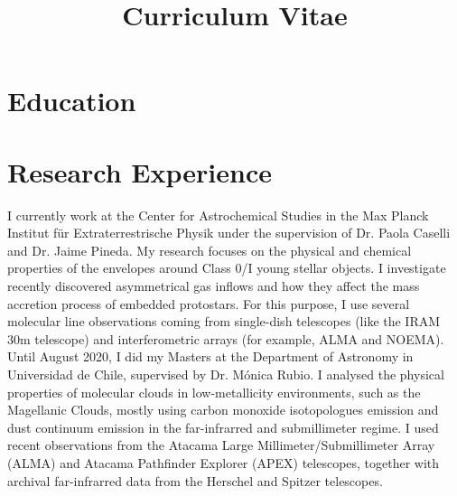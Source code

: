 \documentclass[11pt,a4paper,verdana]{moderncv} %
\title{Curriculum Vitae}
\begin{document}
\makecvtitle %

\section{Education}

\section{Research Experience}

I currently work at the Center for Astrochemical Studies in the Max Planck Institut f\"{u}r Extraterrestrische Physik under the supervision of Dr. Paola Caselli and Dr. Jaime Pineda. My research focuses on the physical and chemical properties of the envelopes around Class 0/I young stellar objects. I investigate recently discovered asymmetrical gas inflows and how they affect the mass accretion process of embedded protostars. For this purpose, I use several molecular line observations coming from single-dish telescopes (like the IRAM 30m telescope) and interferometric arrays (for example, ALMA and NOEMA). 
\\
Until August 2020, I did my Masters at the Department of Astronomy in Universidad de Chile, supervised by Dr. M\'onica Rubio. I analysed the physical properties of molecular clouds in low-metallicity environments, such as the Magellanic Clouds, mostly using carbon monoxide isotopologues emission and dust continuum emission in the far-infrarred and submillimeter regime. I used recent observations from the Atacama Large Millimeter/Submillimeter Array (ALMA) and Atacama Pathfinder Explorer (APEX) telescopes, together with archival far-infrarred data from the Herschel and Spitzer telescopes.
\end{document}
